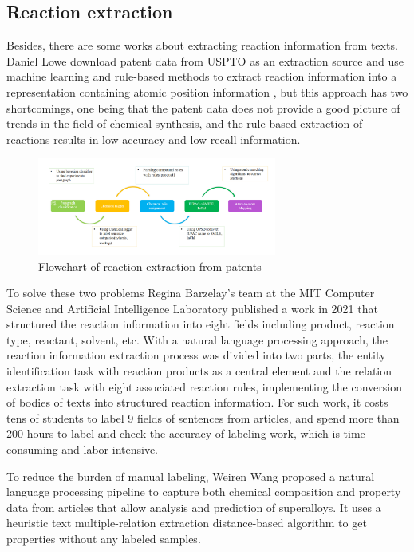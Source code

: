 \documentclass[%
 aip,
 jmp,%
 amsmath,amssymb,
 reprint,%
]{revtex4-2}
\begin{document}
\subsection{Reaction extraction}
Besides, there are some works about extracting reaction information from texts.
Daniel Lowe download patent data from USPTO as an extraction source and use machine learning and rule-based 
methods to extract reaction information into a representation containing atomic position information \cite{lowe2012extraction}, 
but this approach has two shortcomings, one being that the patent data does not provide a good picture 
of trends in the field of chemical synthesis, and the rule-based extraction of reactions results in 
low accuracy and low recall information.

\begin{figure}[htbp]
 \centering
 \includegraphics[width=0.7\textwidth]{figure/8.png}
 \caption{ Flowchart of reaction extraction from patents }
 \label{ Fig.8 }
\end{figure}

To solve these two problems Regina Barzelay's team at the MIT Computer Science and Artificial Intelligence Laboratory published a work 
in 2021 that structured the reaction information into eight fields including product, reaction type, reactant, solvent, etc. With a 
natural language processing approach, the reaction information extraction process was divided into two parts, the entity identification task
with reaction products as a central element and the relation extraction task with eight associated reaction rules,
implementing the conversion of bodies of texts into structured reaction information\cite{guo2021automated}. For such work, it costs tens of students to label 9 fields of sentences 
from articles, and spend more than 200 hours to label and check the accuracy of labeling work, which is time-consuming and labor-intensive.

To reduce the burden of manual labeling, Weiren Wang proposed a natural language processing pipeline to capture both chemical composition and property data 
from articles that allow analysis and prediction of superalloys. It uses a heuristic text multiple-relation extraction distance-based algorithm to get 
properties without any labeled samples\cite{wang2022automated}.
\end{document}
